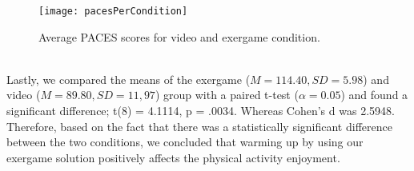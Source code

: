 \begin{figure}[h]
    \centering
    \texttt{[image: pacesPerCondition]}
    \caption{Average PACES scores for video and exergame condition.}
\label{fig:pacesPerCondition}
\end{figure}\\
Lastly, we compared the means of the exergame (\begin{math}M = 114.40 , SD = 5.98\end{math}) and video (\begin{math}M = 89.80, SD = 11,97\end{math}) group with a paired t-test (\begin{math}\alpha = 0.05\end{math}) and found a significant difference; t(8) = 4.1114, p = .0034. Whereas Cohen's d was 2.5948. Therefore, based on the fact that there was a statistically significant difference between the two conditions, we concluded that warming up by using our exergame solution positively affects the physical activity enjoyment.
